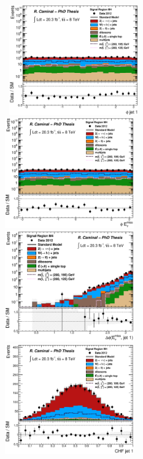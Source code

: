 \begin{figure}[!ht]
  \begin{center}
    \mbox{
      \includegraphics[width=0.495\textwidth]{MonojetAnalysis/Figures/plot_Stop_A8_SR_phi1_fitted.eps}
      \includegraphics[width=0.495\textwidth]{MonojetAnalysis/Figures/plot_Stop_A8_SR_met_phi_fitted.eps}
    }
    \mbox{
      \includegraphics[width=0.495\textwidth]{MonojetAnalysis/Figures/plot_Stop_A8_SR_dPhi_met_j1_fitted.eps}
      \includegraphics[width=0.495\textwidth]{MonojetAnalysis/Figures/plot_Stop_A8_SR_j1_chf_fitted.eps}
}
\end{center}
\end{figure}

